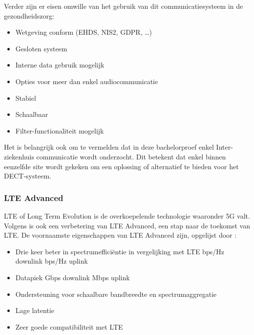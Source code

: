 Verder zijn er eisen omwille van het gebruik van dit communicatiesysteem in de gezondheidszorg:

\begin{itemize}
  \item Wetgeving conform (EHDS, NIS2, GDPR, \dots)
  \item Gesloten systeem
  \item Interne data gebruik mogelijk
  \item Opties voor meer dan enkel audiocommunicatie
  \item Stabiel
  \item Schaalbaar
  \item Filter-functionaliteit mogelijk
\end{itemize}

Het is belangrijk ook om te vermelden dat in deze bachelorproef enkel Inter-ziekenhuis communicatie wordt onderzocht. Dit betekent dat enkel binnen eenzelfde site wordt gekeken om een oplossing of alternatief te bieden voor het DECT-systeem.

\subsubsection{LTE Advanced}

LTE of Long Term Evolution is de overkoepelende technologie waaronder 5G valt. Volgens \textcite{Bakare2022} is ook een verbetering van LTE Advanced, een stap naar de toekomst van LTE. De voornaamste eigenschappen van LTE Advanced zijn, opgelijst door \textcite{Bakare2022}:

\begin{itemize}
  \item Drie keer beter in spectrumefficiëntie in vergelijking met LTE
   bps/Hz downlink
   bps/Hz uplink
  \item Datapiek 
   Gbps downlink
   Mbps uplink
  \item Ondersteuning voor schaalbare bandbreedte en spectrumaggregatie
  \item Lage latentie
  \item Zeer goede compatibiliteit met LTE
\end{itemize}

